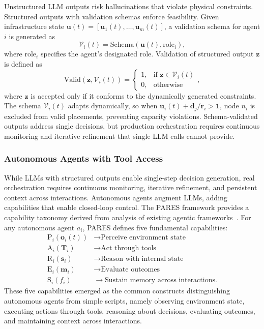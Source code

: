 Unstructured \ac{LLM} outputs risk hallucinations that violate physical constraints. Structured outputs with validation schemas enforce feasibility. Given infrastructure state $\mathbf{u}(t) = [\mathbf{u}_1(t), \ldots, \mathbf{u}_m(t)]$, a validation schema for agent $i$ is generated as
\begin{equation}
\mathcal{V}_i(t) = \text{Schema}(\mathbf{u}(t), \text{role}_i),
\end{equation}
where $\text{role}_i$ specifies the agent's designated role. Validation of structured output $\mathbf{z}$ is defined as
\begin{equation}
\text{Valid}(\mathbf{z}, \mathcal{V}_i(t)) = \begin{cases}
1, & \text{if } \mathbf{z} \in \mathcal{V}_i(t) \\
0, & \text{otherwise}
\end{cases},
\end{equation}
where $\mathbf{z}$ is accepted only if it conforms to the dynamically generated constraints. The schema $\mathcal{V}_i(t)$ adapts dynamically, so when $\mathbf{u}_i(t) + \mathbf{d}_j/\mathbf{r}_i > \mathbf{1}$, node $n_i$ is excluded from valid placements, preventing capacity violations. Schema-validated outputs address single decisions, but production orchestration requires continuous monitoring and iterative refinement that single \ac{LLM} calls cannot provide.

\subsubsection{Autonomous Agents with Tool Access}

While \acp{LLM} with structured outputs enable single-step decision generation, real orchestration requires continuous monitoring, iterative refinement, and persistent context across interactions. Autonomous agents augment \acp{LLM}, adding capabilities that enable closed-loop control. The \ac{PARES} framework provides a capability taxonomy derived from analysis of existing agentic frameworks~\cite{sumers2024cognitive,Park2023GenerativeAgents,huang2023benchmarking,hao2023toolkengpt,zhang2023planning,promptreport2024}. For any autonomous agent $a_i$, \ac{PARES} defines five fundamental capabilities:
\begin{align}
\text{P}_i(\mathbf{o}_i(t)) &\rightarrow \text{Perceive environment state} \nonumber \\
\text{A}_i(\mathbf{T}_i) &\rightarrow \text{Act through tools} \nonumber \\
\text{R}_i(\mathbf{s}_i) &\rightarrow \text{Reason with internal state} \nonumber \\
\text{E}_i(\mathbf{m}_i) &\rightarrow \text{Evaluate outcomes} \nonumber \\
\text{S}_i(f_i) &\rightarrow \text{Sustain memory across interactions}. \label{eq:ch2_pares}
\end{align}
These five capabilities emerged as the common constructs distinguishing autonomous agents from simple scripts, namely observing environment state, executing actions through tools, reasoning about decisions, evaluating outcomes, and maintaining context across interactions.

